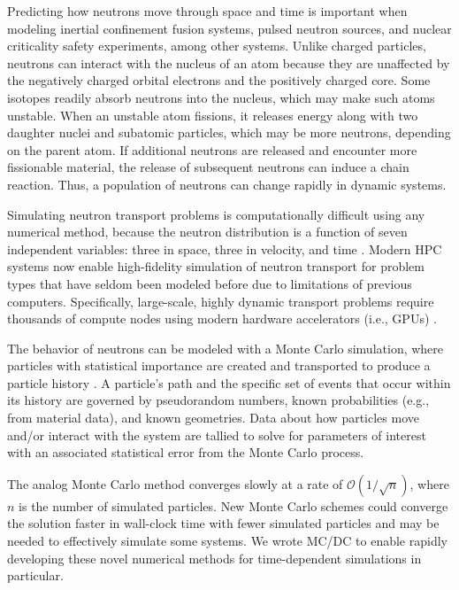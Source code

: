 Predicting how neutrons move through space and time is important when modeling inertial confinement fusion systems, pulsed neutron sources, and nuclear criticality safety experiments, among other systems.
Unlike charged particles, neutrons can interact with the nucleus of an atom because they are unaffected by the negatively charged orbital electrons and the positively charged core.
Some isotopes readily absorb neutrons into the nucleus, which may make such atoms unstable.
When an unstable atom fissions, it releases energy along with two daughter nuclei and subatomic particles, which may be more neutrons, depending on the parent atom.
If additional neutrons are released and encounter more fissionable material, the release of subsequent neutrons can induce a chain reaction.
Thus, a population of neutrons can change rapidly in dynamic systems.

Simulating neutron transport problems is computationally difficult using any numerical method, because the neutron distribution is a function of seven independent variables: three in space, three in velocity, and time \cite{lewis_computational_1984}.
Modern HPC systems now enable high-fidelity simulation of neutron transport for problem types that have seldom been modeled before due to limitations of previous computers. %
Specifically, large-scale, highly dynamic transport problems require thousands of compute nodes using modern hardware accelerators (i.e., GPUs) \cite{hamilton_continuous-energy_2019, romano_openmc_2015}.

The behavior of neutrons can be modeled with a Monte Carlo simulation, where particles with statistical importance are created and transported to produce a particle history \cite{lewis_computational_1984}.
A particle's path and the specific set of events that occur within its history are governed by pseudorandom numbers, known probabilities (e.g., from material data), and known geometries.
Data about how particles move and/or interact with the system are tallied to solve for parameters of interest with an associated statistical error from the Monte Carlo process.

The analog Monte Carlo method converges slowly at a rate of $\mathcal{O}(1/\sqrt{n})$, where $n$ is the number of simulated particles.
New Monte Carlo schemes could converge the solution faster in wall-clock time with fewer simulated particles and may be needed to effectively simulate some systems.
We wrote MC/DC to enable rapidly developing these novel numerical methods for time-dependent simulations in particular.



